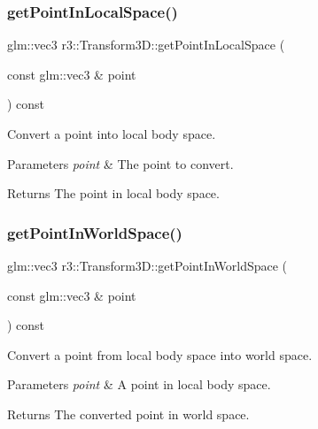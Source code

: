 \subsubsection{\texorpdfstring{get\+Point\+In\+Local\+Space()}{getPointInLocalSpace()}}
{\footnotesize\ttfamily glm\+::vec3 r3\+::\+Transform3\+D\+::get\+Point\+In\+Local\+Space (\begin{DoxyParamCaption}\item[{const glm\+::vec3 \&}]{point }\end{DoxyParamCaption}) const}



Convert a point into local body space. 


\begin{DoxyParams}{Parameters}
{\em point} & The point to convert. \\
\hline
\end{DoxyParams}
\begin{DoxyReturn}{Returns}
The point in local body space. 
\end{DoxyReturn}
\mbox{\label{classr3_1_1_transform3_d_a4ecfb0e1518fbeaaa838da02402d0bd9}} 
\subsubsection{\texorpdfstring{get\+Point\+In\+World\+Space()}{getPointInWorldSpace()}}
{\footnotesize\ttfamily glm\+::vec3 r3\+::\+Transform3\+D\+::get\+Point\+In\+World\+Space (\begin{DoxyParamCaption}\item[{const glm\+::vec3 \&}]{point }\end{DoxyParamCaption}) const}



Convert a point from local body space into world space. 


\begin{DoxyParams}{Parameters}
{\em point} & A point in local body space. \\
\hline
\end{DoxyParams}
\begin{DoxyReturn}{Returns}
The converted point in world space. 
\end{DoxyReturn}
\mbox{\label{classr3_1_1_transform3_d_abe9ff86c845d54cd297ff00fd21aad71}} 
